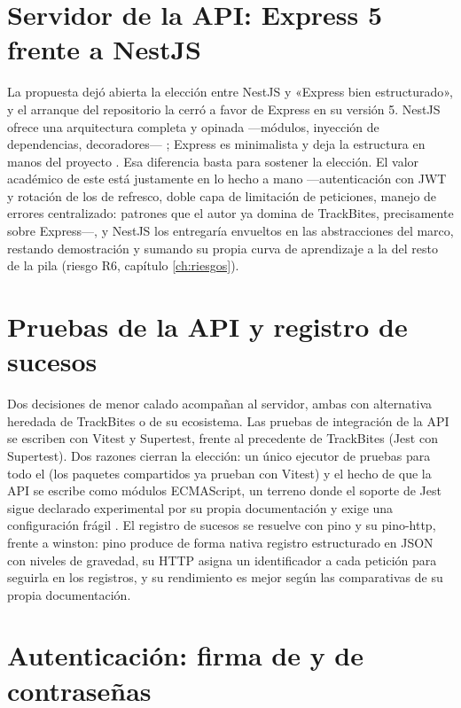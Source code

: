 \section{Servidor de la \acs{API}: Express 5 frente a NestJS}
\label{sec:alt-servidor}

La propuesta dejó abierta la elección entre NestJS y «Express bien estructurado», y el arranque del repositorio la cerró a favor de Express en su versión 5.
NestJS ofrece una arquitectura completa y opinada —módulos, inyección de dependencias, decoradores— \parencite{nestjs-docs}; Express es minimalista y deja la estructura en manos del proyecto \parencite{express-docs}.
Esa diferencia basta para sostener la elección.
El valor académico de este  está justamente en lo hecho a mano —autenticación con \ac{JWT} y rotación de los  de refresco, doble capa de limitación de peticiones, manejo de errores centralizado: patrones que el autor ya domina de TrackBites, precisamente sobre Express—, y NestJS los entregaría envueltos en las abstracciones del marco, restando demostración y sumando su propia curva de aprendizaje a la del resto de la pila (riesgo R6, capítulo \ref{ch:riesgos}).

\section{Pruebas de la \acs{API} y registro de sucesos}
\label{sec:alt-pruebas-registro}

Dos decisiones de menor calado acompañan al servidor, ambas con alternativa heredada de TrackBites o de su ecosistema.
Las pruebas de integración de la \ac{API} se escriben con Vitest \parencite{vitest-docs} y Supertest, frente al precedente de TrackBites (Jest con Supertest).
Dos razones cierran la elección: un único ejecutor de pruebas para todo el  (los paquetes compartidos ya prueban con Vitest) y el hecho de que la \ac{API} se escribe como módulos ECMAScript, un terreno donde el soporte de Jest sigue declarado experimental por su propia documentación y exige una configuración frágil \parencite{jest-docs}.
El registro de sucesos se resuelve con pino \parencite{pino-docs} y su  pino-http, frente a winston: pino produce de forma nativa registro estructurado en \ac{JSON} con niveles de gravedad, su  \ac{HTTP} asigna un identificador a cada petición para seguirla en los registros, y su rendimiento es mejor según las comparativas de su propia documentación.

\section{Autenticación: firma de  y  de contraseñas}
\label{sec:alt-autenticacion}

